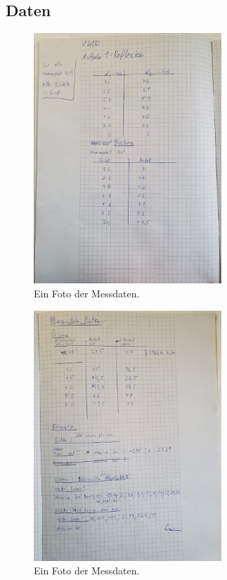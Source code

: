 \subsection{Daten}
\begin{figure}[H]
    \centering
    \includegraphics[width=0.63\textwidth]{latex/images/werte1.jpeg}
    \caption{Ein Foto der Messdaten.}
    \label{img:Daten1}
\end{figure}
\begin{figure}[H]
    \centering
    \includegraphics[width=0.63\textwidth]{latex/images/werte2.jpeg}
    \caption{Ein Foto der Messdaten.}
    \label{img:Daten2}
\end{figure}


